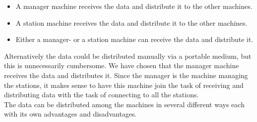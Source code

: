 \documentclass[a4paper]{report}
\begin{document}
\begin{itemize}
\item A manager machine receives the data and distribute it to the other machines.
\item A station machine receives the data and distribute it to the other machines.
\item Either a manager- or a station machine can receive the data and distribute it.
\end{itemize}

Alternatively the data could be distributed manually via a portable medium, but this is unnecessarily cumbersome. We have chosen that the manager machine receives the data and distributes it. Since the manager is the machine managing the stations, it makes sense to have this machine join the task of receiving and distributing data with the task of connecting to all the stations. \\

The data can be distributed among the machines in several different ways each with its own advantages and disadvantages.
\end{document}
